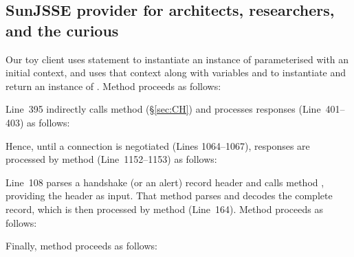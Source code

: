 \subsection{SunJSSE provider for architects, researchers, and the curious}\label{sec:SunJSSE}

Our toy client uses statement  
to instantiate an instance of 
 parameterised with an initial context, and uses that 
context along with variables  and  to instantiate and return an 
instance of . Method  proceeds as follows:



\noindent
Line~395 indirectly calls method  (\S\ref{sec:CH}) and processes 
responses (Line~401--403) as follows:



\noindent
Hence, until a connection is negotiated (Lines 1064--1067), responses are processed by 
method  (Line~1152--1153) as follows:



\noindent
Line~108 parses a handshake (or an alert) record header and calls method 
, providing the header as 
input. That method parses and decodes the complete record, which is then 
processed by method  (Line~164).
%
Method  proceeds as follows:



\noindent
Finally, method  proceeds as follows:



